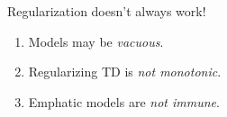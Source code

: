 \vspace{-.2in}
\begin{mybox}
    {\headerfont Regularization doesn't always work!}
    \vspace{.5em}
    {\large
        \begin{enumerate}
            \item Models may be \emph{vacuous}.
            \item Regularizing TD is \emph{not monotonic}.
            \item Emphatic models are \emph{not immune}.
        \end{enumerate}
    }
    \vspace{.5em}
\end{mybox}